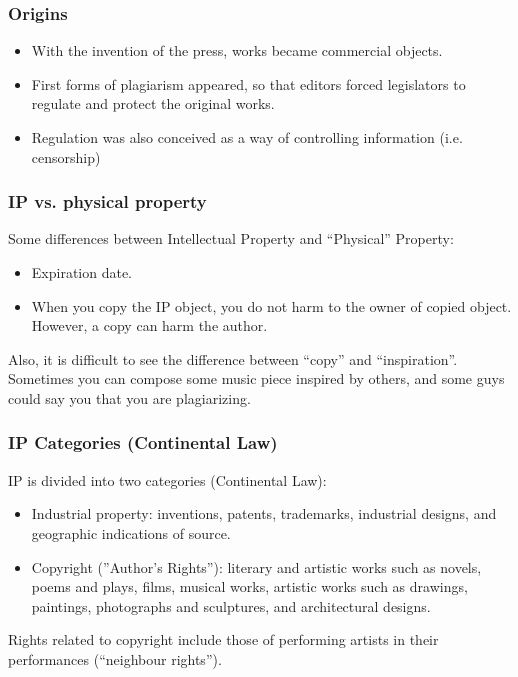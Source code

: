 
\begin{frame}
\frametitle{Origins}

\begin{itemize}
\item With the invention of the press, works became commercial objects.
\item First forms of plagiarism appeared, so that editors forced legislators
to regulate and protect the original works.
\item Regulation was also conceived as a way of controlling information (i.e.
censorship)
\end{itemize}


\end{frame}


\begin{frame}
\frametitle{IP vs. physical property}

Some differences between Intellectual Property and ``Physical''
Property:
\begin{itemize}
\item Expiration date.
\item When you copy the IP object, you do not harm to the owner of
  copied object. However, a copy can harm the author.
\end{itemize}

Also, it is difficult to see the difference between ``copy'' and
``inspiration''. Sometimes you can compose some music piece inspired
by others, and some guys could say you that you are plagiarizing.


\end{frame}




\begin{frame}
\frametitle{IP Categories (Continental Law)}

IP is divided into two categories (Continental Law):  

\begin{itemize}
\item \alert{Industrial property}: inventions, patents, trademarks, industrial designs, and geographic indications of source. 
\item \alert{Copyright} (''Author's Rights''): literary and artistic works such as novels, poems and plays, films, musical works, artistic works such as drawings, paintings, photographs and sculptures, and architectural designs.  
\end{itemize}

Rights related to copyright include those of performing artists in their performances (``neighbour rights'').  

\end{frame}


